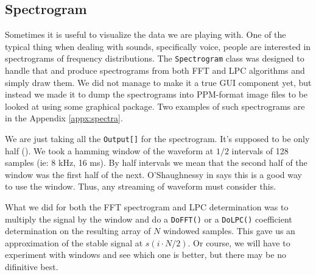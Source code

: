 \subsection{Spectrogram}

Sometimes it is useful to visualize the data we are
playing with. One of the typical thing when dealing with
sounds, specifically voice, people are interested in
spectrograms of frequency distributions. The \verb+Spectrogram+
class was designed to handle that and produce spectrograms
from both FFT and LPC algorithms and simply draw them. We did not
manage to make it a true GUI component yet, but instead we made
it to dump the spectrograms into PPM-format image files to be
looked at using some graphical package. Two examples of
such spectrograms are in the Appendix \ref{appx:spectra}.

We are just taking all the \verb+Output[]+ for the spectrogram. It's
supposed to be only half (\cite{shaughnessy2000}).
We took a hamming window of the waveform at $1/2$ intervals of 128
samples (ie: 8 kHz, 16 ms). By half intervals we mean that the second half
of the window was the first half of the next. O'Shaughnessy in \cite{shaughnessy2000} says this is a
good way to use the window. Thus, any streaming of waveform must consider
this.

What we did for both the FFT spectrogram and LPC determination was to
multiply the signal by the window and do a \verb+DoFFT()+ or a \verb+DoLPC()+ coefficient
determination on the resulting array of $N$ windowed samples. This gave us
an approximation of the stable signal at $s(i \cdot N/2)$.
Or course, we will have to experiment with windows and see which one is better, but
there may be no difinitive best.
